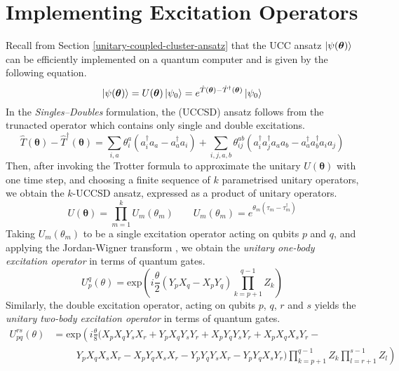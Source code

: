 \section{Implementing Excitation Operators}

Recall from Section \ref{unitary-coupled-cluster-ansatz} that the UCC ansatz $\ket{\psi(\bm\theta)}$ can be efficiently implemented on a quantum computer \cite{Peruzzo2014} and is given by the following equation.
\begin{equation*}
    \ket{\psi(\bm\theta)} = U(\bm\theta) \ket{\psi_0} =
    e^{\hat T(\bm\theta) - \hat T^\dagger(\bm\theta)} \ket{\psi_0}
\end{equation*}
In the \textit{Singles--Doubles} formulation, the (UCCSD) ansatz follows from the trunacted operator which contains only single and double excitations.
\begin{equation*}
\hat T(\bm{\theta}) - \hat T^{\dagger}(\bm{\theta}) =
\sum_{i, a} \theta^a_i (a^\dagger_i a_a - a^\dagger_a a_i) + 
\sum_{i, j, a, b} \theta^{ab}_{ij} (a^\dagger_i a^\dagger_j a_a a_b - a^\dagger_a a^\dagger_b a_i a_j)
\end{equation*}
Then, after invoking the Trotter formula to approximate the unitary $U(\bm\theta)$ with one time step, and choosing a finite sequence of $k$ parametrised unitary operators, we obtain the $k$-UCCSD ansatz, expressed as a product of unitary operators.
\begin{equation*}
    U(\bm\theta) = \prod_{m=1}^k U_m(\theta_m) \qquad
    U_m(\theta_m) = e^{\theta_m (\tau_m - \tau_m^\dagger)}
\end{equation*}
Taking $U_m(\theta_m)$ to be a single excitation operator acting on qubits $p$ and $q$, and applying the Jordan-Wigner transform \cite{Seeley2020}, we obtain the \textit{unitary one-body excitation operator} in terms of quantum gates.
\begin{equation*}
    U^q_p (\theta) =
    \text{exp} \left( i
    \frac{\theta}{2} (Y_p X_q - X_p Y_q) \prod_{k=p+1}^{q-1} Z_k \right)
\end{equation*}
Similarly, the double excitation operator, acting on qubits $p$, $q$, $r$ and $s$ yields the \textit{unitary two-body excitation operator} in terms of quantum gates.
\begin{align*}
    U^{rs}_{pq} (\theta) &= \text{exp} \left( i \frac{\theta}{8} (
    X_p X_q Y_s X_r +
    Y_p X_q Y_s Y_r +
    X_p Y_q Y_s Y_r +
    X_p X_q X_s Y_r - \right. \\
    &\left. \hspace{1cm} 
    Y_p X_q X_s X_r -
    X_p Y_q X_s X_r -
    Y_p Y_q Y_s X_r -
    Y_p Y_q X_s Y_r )
    \prod_{k=p+1}^{q-1} Z_k
    \prod_{l=r+1}^{s-1} Z_l
    \right)
\end{align*}

